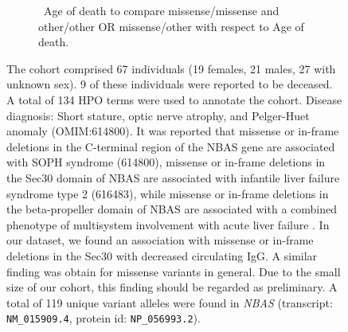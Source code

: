 \begin{figure}[htbp]
\vspace{2em}
\begin{subfigure}[b]{0.95\textwidth}
\captionsetup{justification=raggedright,singlelinecheck=false}
\caption{ Age of death to compare missense/missense and other/other OR missense/other with respect to Age of death. }
\end{subfigure}

\vspace{2em}

\caption{ The cohort comprised 67 individuals (19 females, 21 males, 27 with unknown sex). 9 of these individuals were reported to be deceased. A total of 134 HPO terms were used to annotate the cohort. Disease diagnosis: Short stature, optic nerve atrophy, and Pelger-Huet anomaly (OMIM:614800). It was reported that missense or in-frame deletions in the C-terminal region of the NBAS gene are associated with  SOPH syndrome (614800), 
missense or in-frame deletions in the Sec30 domain of NBAS are associated with infantile liver failure syndrome type 2 (616483), 
while missense or in-frame deletions in the beta-propeller domain of NBAS are associated with a combined phenotype of multisystem involvement with acute liver failure \cite{PMID_38244286}.
In our dataset, we found an association with  missense or in-frame deletions in the Sec30 with decreased circulating IgG. A similar finding was obtain for missense variants in general.
Due to the small size of our cohort, this finding should be regarded as preliminary.
 A total of 119 unique variant alleles were found in \textit{NBAS} (transcript: \texttt{NM\_015909.4}, protein id: \texttt{NP\_056993.2}).}
\end{figure}

